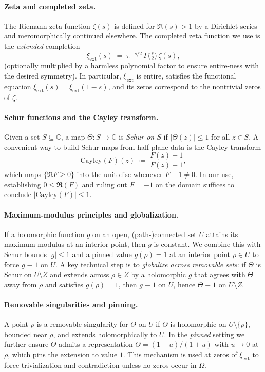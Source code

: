 \documentclass[11pt]{article}
\theoremstyle{plain}
\theoremstyle{definition}
\begin{document}
\paragraph{Zeta and completed zeta.}
The Riemann zeta function \(\zeta(s)\) is defined for \(\Re(s)>1\) by a Dirichlet series and meromorphically continued elsewhere. The completed zeta function we use is the \emph{extended} completion
\[
  \xi_{\mathrm{ext}}(s) \;=\; \pi^{-s/2}\,\Gamma\!\bigl(\tfrac{s}{2}\bigr)\,\zeta(s),
\]
(optionally multiplied by a harmless polynomial factor to ensure entire-ness with the desired symmetry). In particular, \(\xi_{\mathrm{ext}}\) is entire, satisfies the functional equation \(\xi_{\mathrm{ext}}(s)=\xi_{\mathrm{ext}}(1-s)\), and its zeros correspond to the nontrivial zeros of \(\zeta\).

\paragraph{Schur functions and the Cayley transform.}
Given a set \(S\subseteq\mathbb{C}\), a map \(\Theta:S\to\mathbb{C}\) is \emph{Schur on \(S\)} if \(|\Theta(z)|\le 1\) for all \(z\in S\). A convenient way to build Schur maps from half-plane data is the Cayley transform
\[
  \mathrm{Cayley}(F)(z) \;\coloneqq\; \frac{F(z)-1}{F(z)+1},
\]
which maps \(\{ \Re F \ge 0 \}\) into the unit disc whenever \(F+1\neq 0\). In our use, establishing \(0\le \Re(F)\) and ruling out \(F=-1\) on the domain suffices to conclude \(|\mathrm{Cayley}(F)|\le 1\).

\paragraph{Maximum-modulus principles and globalization.}
If a holomorphic function \(g\) on an open, (path-)connected set \(U\) attains its maximum modulus at an interior point, then \(g\) is constant. We combine this with Schur bounds \(|g|\le 1\) and a pinned value \(g(\rho)=1\) at an interior point \(\rho\in U\) to force \(g\equiv 1\) on \(U\). A key technical step is to \emph{globalize across removable sets}: if \(\Theta\) is Schur on \(U\setminus Z\) and extends across \(\rho\in Z\) by a holomorphic \(g\) that agrees with \(\Theta\) away from \(\rho\) and satisfies \(g(\rho)=1\), then \(g\equiv 1\) on \(U\), hence \(\Theta\equiv 1\) on \(U\setminus Z\).

\paragraph{Removable singularities and pinning.}
A point \(\rho\) is a removable singularity for \(\Theta\) on \(U\) if \(\Theta\) is holomorphic on \(U\setminus\{\rho\}\), bounded near \(\rho\), and extends holomorphically to \(U\). In the \emph{pinned} setting we further ensure \(\Theta\) admits a representation \(\Theta=(1-u)/(1+u)\) with \(u\to 0\) at \(\rho\), which pins the extension to value \(1\). This mechanism is used at zeros of \(\xi_{\mathrm{ext}}\) to force trivialization and contradiction unless no zeros occur in \(\Omega\).
\end{document}
